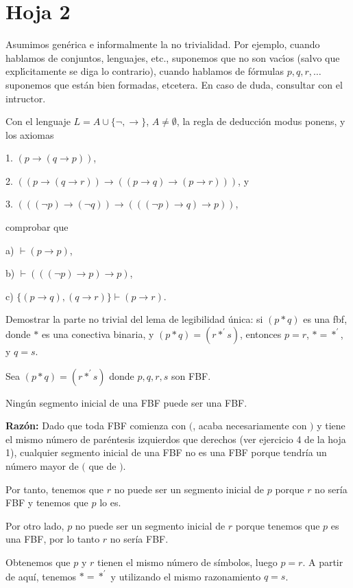 \section{Hoja 2}

Asumimos gen\'erica e informalmente la no trivialidad. Por ejemplo,
cuando hablamos de conjuntos, lenguajes, etc., suponemos que no  son vac\'{\i}os (salvo que 
expl\'{\i}citamente
se diga lo contrario),  cuando hablamos de f\'ormulas $p, q, r, \dots$ 
suponemos que est\'an bien formadas, etcetera.
En caso de duda, consultar con el intructor. 

\begin{problem}[1]
Con el lenguaje $L = A \cup \{\neg, \to\}$, $A \ne \emptyset$, la regla de deducci\'on modus ponens,
y los axiomas

1.  $ (p\to (q\to p))$,

2. $( (p\to (q\to r)) \to  ( (p\to q) \to (p\to r)))$, y

3. $(( (\neg p) \to (\neg q)) \to  ( ((\neg p) \to q) \to p))$,

comprobar que 

a) $\vdash (p\to p)$,

b) $\vdash ((( \neg p) \to p)\to p)$,

c)  $\{(p\to q), (q\to r)\} \vdash (p\to r)$.
\solution
\end{problem} 

\begin{problem}[2]
Demostrar la parte no trivial del lema de legibilidad \'unica: si $(p * q)$ es una fbf, donde $*$ es una conectiva
binaria, y $(p * q) = (r *^\prime s)$, entonces $p = r$,  $*  = *^\prime$, y $q = s$.
\solution
{}

Sea $(p \ast q) = (r\ast^\prime s)$ donde $p,q,r,s$ son FBF.

Ningún segmento inicial de una FBF puede ser una FBF.

\textbf{Razón: } Dado que toda FBF comienza con $($, acaba necesariamente con $)$ y tiene el mismo número de paréntesis izquierdos que derechos (ver ejercicio 4 de la hoja 1), cualquier segmento inicial de una FBF no es una FBF porque tendría un número mayor de $($ que de $)$.

Por tanto, tenemos que $r$ no puede ser un segmento inicial de $p$ porque $r$ no sería FBF y tenemos que $p$ lo es.

Por otro lado, $p$ no puede ser un segmento inicial de $r$ porque tenemos que $p$ es una FBF, por lo tanto $r$ no sería FBF.

Obtenemos que $p$ y $r$ tienen el mismo número de símbolos, luego $p=r$. A partir de aquí, tenemos $\ast = \ast^\prime$ y utilizando el mismo razonamiento $q=s$.

\end{problem}


